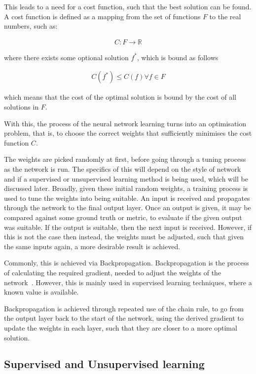 This leads to a need for a cost function, such that the best solution can be found.
A cost function is defined as a mapping from the set of functions $F$ to the real
numbers, such as:

\begin{align}
    C : F \rightarrow \mathbb{R}
\end{align}

where there exists some optional solution $f^*$, which is bound as follows

\begin{align}
    C(f^*) \le C(f) \forall f \in F
\end{align}

which means that the cost of the optimal solution is bound by the cost of
all solutions in $F$.

With this, the process of the neural network learning turns into an
optimisation problem, that is, to choose the correct weights that sufficiently
minimises the cost function $C$.

The weights are picked randomly at first, before going through a tuning
process as the network is run. The specifics of this will depend on
the style of network and if a supervised or unsupervised learning method
is being used, which will be discussed later. Broadly, given these
initial random weights, a training process is used to tune the weights
into being suitable. An input is received and propagates through the
network to the final output layer. Once an output is given, it may be compared
against some ground truth or metric, to evaluate if the given output was suitable.
If the output is suitable, then the next input is received. However, if this
is not the case then instead, the weights must be adjusted, such that
given the same inputs again, a more desirable result is achieved.

Commonly, this is achieved via Backpropagation. Backpropagation is the process
of calculating the required gradient, needed to adjust the weights of the
network~\cite{goodfellow2016deep}. However, this is mainly used
in supervised learning techniques, where a known value is available.

Backpropagation is achieved through repeated use of the chain rule,
to go from the output layer back to the start of the network,
using the derived gradient to update the weights in each layer,
such that they are closer to a more optimal solution.


\subsection{Supervised and Unsupervised learning}

